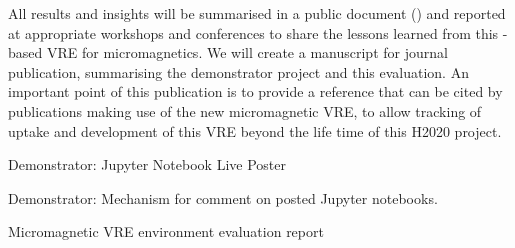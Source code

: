 \begin{workpackage}[id=social-aspects,wphases=0-48,
  title=Social Aspects,
  lead=UO,
  UORM=51,USHRM=8, USORM=6]
\begin{tasklist}
\begin{task}[title=Evaluation of Micromagnetic VRE,lead=USO,PM=6,id=oommf-nb-evaluation]
  All results and insights will be summarised in a public document
  () and reported at appropriate
  workshops and conferences to share the lessons learned from this
  \Jupyter-based VRE for micromagnetics. We will create a manuscript
  for journal publication, summarising the demonstrator project and
  this evaluation. An important point of this publication is to
  provide a reference that can be cited by publications making use of
  the new micromagnetic VRE, to allow tracking of uptake and
  development of this VRE beyond the life time of this H2020 project.
\end{task}



\end{tasklist}


\begin{wpdelivs}
 \begin{wpdeliv}[due=36,id=social-poster,dissem=PU,nature=DEM,lead=USH]
   {Demonstrator: Jupyter Notebook Live Poster} 
\end{wpdeliv}
 \begin{wpdeliv}[due=24,id=social-poster,dissem=PU,nature=DEM,lead=USH]
   {Demonstrator: Mechanism for comment on posted Jupyter notebooks.} 
\end{wpdeliv}
 \begin{wpdeliv}[due=48,id=oommf-nb-evaluation,dissem=PU,nature=R,lead=USO]
      {Micromagnetic VRE environment evaluation report}
\end{wpdeliv}
\end{wpdelivs}
\end{workpackage}

